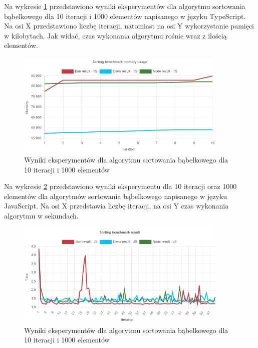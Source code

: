 Na wykresie \ref{fig:bubble_sorting_e1_memory_ts} przedstawiono wyniki eksperymentów dla algorytmu sortowania bąbelkowego dla 10 iteracji i 1000 elementów napisanego w języku TypeScript. Na osi X przedstawiono liczbę iteracji, natomiast na osi Y wykorzystanie pamięci w kilobytach. Jak widać, czas wykonania algorytmu rośnie wraz z ilością elementów.
\begin{figure}[H]
  \centering
  \includegraphics[width=0.9\textwidth]{Figures/sorting/bubble/e1_memory_ts.png}
  \caption{Wyniki eksperymentów dla algorytmu sortowania bąbelkowego dla 10 iteracji i 1000 elementów}
  \label{fig:bubble_sorting_e1_memory_ts}
\end{figure}

Na wykresie \ref{fig:bubble_sorting_e2} przedstawiono wyniki eksperymentu dla 10 iteracji oraz 1000 elementów dla algorytmów sortowania bąbelkowego napisanego w języku JavaScript. Na osi X przedstawia liczbę iteracji, na osi Y czas wykonania algorytmu w sekundach. 

\begin{figure}[H]
  \centering
  \includegraphics[width=0.9\textwidth]{Figures/sorting/bubble/e2_js.png}
  \caption{Wyniki eksperymentów dla algorytmu sortowania bąbelkowego dla 10 iteracji i 1000 elementów}
  \label{fig:bubble_sorting_e2}
\end{figure}

